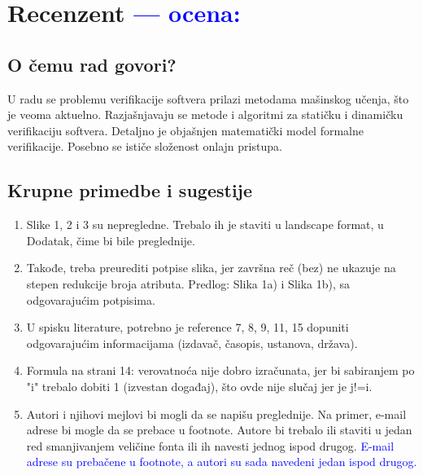 \documentclass[a4paper]{report}
\newcommand{\odgovor}[1]{\textcolor{blue}{#1}}
\begin{document}
\chapter{Recenzent \odgovor{--- ocena:} }

\section{O čemu rad govori?}

U radu se problemu verifikacije softvera prilazi metodama mašinskog učenja, što je veoma aktuelno.
Razjašnjavaju se metode i algoritmi za statičku i dinamičku verifikaciju softvera.
Detaljno je objašnjen matematički model formalne verifikacije.
Posebno se ističe složenost onlajn pristupa.

\section{Krupne primedbe i sugestije}

\begin{enumerate}
\item Slike 1, 2 i 3 su nepregledne.
Trebalo ih je staviti u landscape format, u Dodatak, čime bi bile preglednije.
\item Takođe, treba preurediti potpise slika,
jer završna reč (bez) ne ukazuje na stepen redukcije broja atributa.
Predlog:
Slika 1a) i Slika 1b), sa odgovarajućim potpisima.
\item U spisku literature, potrebno je reference 7, 8, 9, 11, 15
dopuniti odgovarajućim informacijama (izdavač, časopis, ustanova, država).
\item Formula na strani 14: verovatnoća nije dobro izračunata,
jer bi sabiranjem po "i" trebalo dobiti 1 (izvestan događaj), što ovde nije slučaj jer je j!=i.
\item Autori i njihovi mejlovi bi mogli da se napišu preglednije.
Na primer, e-mail adrese bi mogle da se prebace u footnote.
Autore bi trebalo ili staviti u jedan red smanjivanjem veličine fonta
ili ih navesti jednog ispod drugog.
\odgovor{E-mail adrese su prebačene u footnote, a autori su sada navedeni jedan ispod drugog.}
\end{enumerate}
\end{document}
